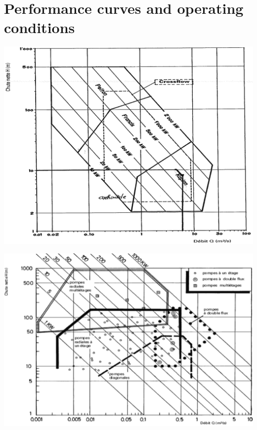 \section{Performance curves and operating conditions}
\begin{center}
\begin{minipage}{0.3\textwidth}
\begin{center}
\includegraphics[scale=0.2]{ch4/13}
\end{center}
\end{minipage}
\quad
\begin{minipage}{0.3\textwidth}
\begin{center}
\includegraphics[scale=0.2]{ch4/14}
\end{center}

\end{minipage}
\end{center}
